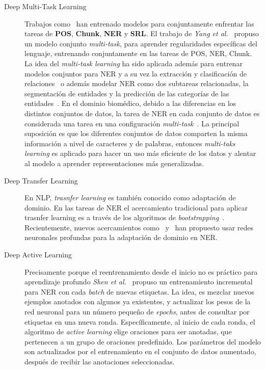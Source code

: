 \begin{description}
	\item[Deep Multi-Task Learning] Trabajos como~\cite{collobert2011natural} han entrenado modelos para conjuntamente enfrentar las tareas de \textbf{POS}, \textbf{Chunk}, \textbf{NER} y \textbf{SRL}. El trabajo de \emph{Yang et al.}~\cite{yang2016multi} propuso un modelo conjunto \emph{multi-task}, para aprender regularidades espec\'ificas del lenguaje, entrenando conjuntamente en las tareas de POS, NER, Chunk. La idea del \emph{multi-task learning} ha sido aplicada adem\'as para entrenar modelos conjuntos para NER y a su vez la extracci\'on y clasificaci\'on de relaciones~\cite{zhou2017joint} o adem\'as modelar NER como dos subtareas relacionadas, la segmentaci\'on de entidades y la predicci\'on de las categor\'ias de las entidades~\cite{aguilar2019multi}. En el dominio biom\'edico, debido a las diferencias en los distintos conjuntos de datos, la tarea de NER en cada conjunto de datos es considerada una tarea en una configuraci\'on \emph{multi-task}~\cite{wang2019cross}. La principal suposici\'on es que los diferentes conjuntos de datos comparten la misma informaci\'on a nivel de caracteres y de palabras, entonces \emph{multi-taks learning} es aplicado para hacer un uso m\'as eficiente de los datos y alentar al modelo a aprender representaciones m\'as generalizadas.
	
	\item[Deep Transfer Learning] En NLP, \emph{trasnfer learning} es tambi\'en conocido como adaptaci\'on de dominio. En las tareas de NER el acercamiento tradicional para aplicar trasnfer learning es a trav\'es de los algoritmos de \emph{bootstrapping}~\cite{wu2009domain}. Recientemente, nuevos acercamientos como~\cite{lee2017transfer} y~\cite{giorgi2018transfer}  han propuesto usar redes neuronales profundas para la adaptaci\'on de dominio en NER.
	
	\item[Deep Active Learning] Precisamente porque el reentrenamiento desde el inicio no es pr\'actico para aprendizaje profundo \emph{Shen et al.}~\cite{shen2017deep} propuso un entrenamiento incremental para NER con cada \emph{batch} de nuevas etiquetas. La idea, es mezclar nuevos ejemplos anotados con algunos ya existentes, y actualizar los pesos de la red neuronal para un n\'umero peque\~no de \emph{epochs}, antes de consultar por etiquetas en una nueva ronda. Espec\'ificamente, al inicio de cada ronda, el algoritmo de \emph{active learning} elige oraciones para ser anotadas, que pertenecen a un grupo de oraciones predefinido. Los par\'ametros del modelo son actualizados por el entrenamiento en el conjunto de datos aumentado, despu\'es de recibir las anotaciones seleccionadas.
	

\end{description}
